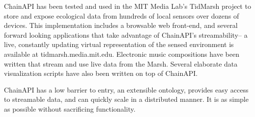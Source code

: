 ChainAPI has been tested and used in the MIT Media Lab's TidMarsh project to store and expose ecological data from hundreds of local sensors over dozens of devices.  This implementation includes a browsable web front-end, and several forward looking applications that take advantage of ChainAPI's streamability-- a live, constantly updating virtual representation of the sensed environment is available at tidmarsh.media.mit.edu.  Electronic music compositions have been written that stream and use live data from the Marsh. \cite{evan}  Several elaborate data visualization scripts have also been written on top of ChainAPI. \cite{tidviz}

ChainAPI has a low barrier to entry, an extensible ontology, provides easy access to streamable data, and can quickly scale in a distributed manner.  It is as simple as possible without sacrificing functionality.